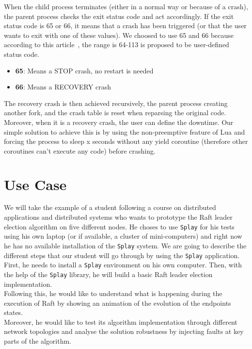 \documentclass{eplmastersthesis}
\begin{document}
        When the child process terminates (either in a normal way or because
        of a crash), the parent process checks the exit status code and act
        accordingly. If the exit status code is 65 or 66, it means that a
        crash has been triggered (or that the user wants to exit
        with one of these values). We choosed to use 65 and 66 because
        according to this article~\cite{StatusCode}, the range is 64-113
        is proposed to be user-defined status code.

        \begin{itemize}
          \item \textbf{65}: Means a STOP crash, no restart is needed
          \item \textbf{66}: Means a RECOVERY crash
        \end{itemize}

        The recovery crash is then achieved recursively, the parent process
        creating another fork, and the crash table is reset when reparsing
        the original code. Moreover, when it is a recovery crash, the user
        can define the downtime. Our simple solution to achieve this is by
        using the non-preemptive feature of Lua and forcing the process
        to sleep x seconds without any yield coroutine (therefore other
        coroutines can't execute any code) before crashing.

  \chapter{Use Case}
  \label{chap:usercase}

    We will take the example of a student following a course on distributed
    applications and distributed systems who wants to prototype the Raft
    leader election algorithm on five different nodes. He choses to use
    \texttt{Splay} for his tests using his own laptop (or if available, a cluster
    of mini-computers) and right now he has no available installation of the
    \texttt{Splay} system. We are going to describe the different steps that our
    student will go through by using the \texttt{Splay} application.\\

    First, he needs to install a \texttt{Splay} environment on his own computer. Then,
    with the help of the \texttt{Splay} library, he will build a basic Raft leader
    election implementation.\\
    Following this, he would like to understand what is happening during the
    execution of Raft by showing an animation of the evolution of the
    endpoints states.\\
    Moreover, he would like to test its algorithm implementation through
    different network topologies and analyse the solution
    robustness by injecting faults at key parts of the algorithm.
\end{document}
